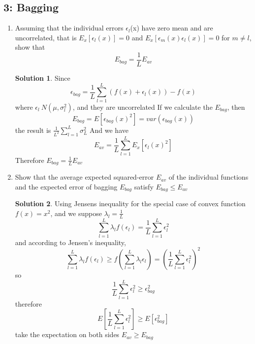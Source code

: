 \documentclass[]{book}
\theoremstyle{definition}
\newtheorem*{soln}{Solution}
\begin{document}
\subsection*{3: Bagging }
	\begin{enumerate}
		\item Assuming that the individual errors $\epsilon_l$(x) have zero mean and are uncorrelated, that is $E_x[\epsilon_l (x)] = 0$ and $E_x[\epsilon_m (x)\epsilon_l (x)] = 0$ for $m \neq l $, show that
		$$ E_{bag} = \frac{1}{L} E_{av}$$
		\begin{soln}
			Since 
			$$\epsilon_{bag} = \frac{1}{L}\sum_{l=1}^{L}(f(x)+\epsilon_l(x)) - f(x)$$
			where $\epsilon_l ~ N(\mu,\sigma_l ^2)$, and they are uncorrelated 
			If we calculate the $ E_{bag}$, then
			$$E_{bag} = E[\epsilon_{bag}(x)^2] = var(\epsilon_{bag}(x))$$
			the result is $\frac{1}{L^2}\sum_{l=1}^{L} \sigma_L ^2$
			And we have
			$$E_{av} = \frac{1}{L}\sum_{l=1}^{L}E_x[\epsilon_l(x)^2]$$
			Therefore $E_{bag} = \frac{1}{L}E_{av}$
		\end{soln}
	\item  Show that the average expected squared-error $E_{av}$ of the individual functions and the expected error of bagging $E_{bag}$ satisfy $E_{bag} \leq E_{av}$
	\begin{soln}
		Using Jensens inequality for the special case of convex function $f(x) = x^2$, and we suppose $\lambda_l = \frac{1}{L}$
		$$\sum_{l =1}^{L}\lambda_l f(\epsilon_l) = \frac{1}{L}\sum_{l = 1}^{L}\epsilon_l^2$$
		and according to Jensen's inequality,
		$$\sum_{l =1}^{L}\lambda_l f(\epsilon_l) \geq f(\sum_{l =1}^{L}\lambda_l \epsilon_l) = (\frac{1}{L}\sum_{l = 1}^{L}\epsilon_l^2)^2$$
		so
		$$\frac{1}{L}\sum_{l = 1}^{L}\epsilon_l^2 \geq \epsilon_{bag}^2$$
		therefore
		$$E[\frac{1}{L}\sum_{l = 1}^{L}\epsilon_l^2] \geq E[\epsilon_{bag}^2]$$
		take the expectation on both sides $E_{av} \geq E_{bag} $
	\end{soln}
	\end{enumerate}
\end{document}
